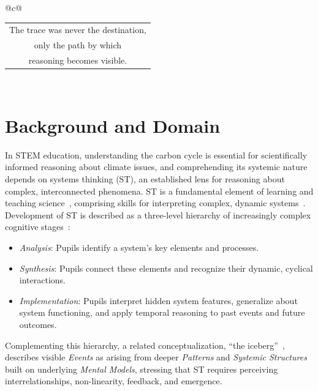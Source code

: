 \begin{center}
\begin{tabular}{@{}c@{}}
\\
{\fmmfamily\LARGE
\begin{tabular}{@{}c@{}}
The trace was never the destination,\\
only the path by which\\
reasoning becomes visible.
\end{tabular}}\\
\end{tabular}
\end{center}





\section{Background and Domain}

In STEM education, understanding the carbon cycle is essential for scientifically informed reasoning about climate issues, and comprehending its systemic nature depends on systems thinking (ST), an established lens for reasoning about complex, interconnected phenomena.
ST is a fundamental element of learning and teaching science~\cite{hmelor2007fish}, comprising skills for interpreting complex, dynamic systems~\cite{verhoeff2018theoretical}.
Development of ST is described as a three-level hierarchy of increasingly complex cognitive stages~\cite{assaraf2005development}:
\begin{itemize}
    \item
    \textit{Analysis}: Pupils identify a system's key elements and processes.
    
    \item
    \textit{Synthesis}: Pupils connect these elements and recognize their dynamic, cyclical interactions.
    
    \item
    \textit{Implementation}: Pupils interpret hidden system features, generalize about system functioning, and apply temporal reasoning to past events and future outcomes.
\end{itemize}
Complementing this hierarchy, a related conceptualization, ``the iceberg''~\cite{kim1999introduction, monat2015what}, describes visible \textit{Events} as arising from deeper \textit{Patterns} and \textit{Systemic Structures} built on underlying \textit{Mental Models}, stressing that ST requires perceiving interrelationships, non-linearity, feedback, and emergence.

